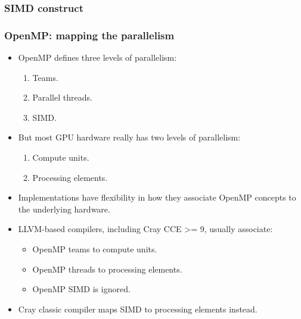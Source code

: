 \documentclass[aspectratio=169]{beamer}
\begin{document}
  \begin{frame}
  \frametitle{SIMD construct}
  
  
  \end{frame}


\begin{frame}
\frametitle{OpenMP: mapping the parallelism}
\begin{itemize}
  \item OpenMP defines three levels of parallelism:
  \begin{enumerate}
    \item Teams.
    \item Parallel threads.
    \item SIMD.
  \end{enumerate}
  \item But most GPU hardware really has two levels of parallelism:
  \begin{enumerate}
  \item Compute units.
  \item Processing elements.
  \end{enumerate}
  \item Implementations have flexibility in how they associate OpenMP concepts to the underlying hardware.
  \item LLVM-based compilers, including Cray CCE >= 9, usually associate:
  \begin{itemize}
    \item OpenMP teams to compute units.
    \item OpenMP threads to processing elements.
    \item OpenMP SIMD is ignored.
  \end{itemize}
  \item Cray classic compiler maps SIMD to processing elements instead.
\end{itemize}
\end{frame}
\end{document}
